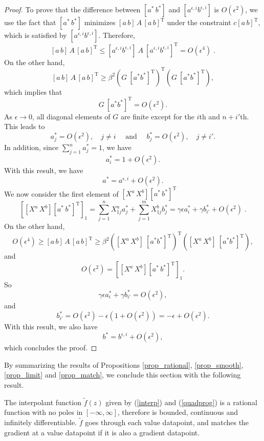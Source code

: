 \begin{proof}
To prove that the difference between $[a^*\,b^*]$ and
$[a^{\epsilon,i} b^{\epsilon,i}]$ is $O(\epsilon^2)$, we use the fact that
$[a^*\,b^*]$ minimizes
$[a\,b]\,A\,[a\,b]^{\mathrm{T}}$ under the constraint $c [a\,b]^{\mathrm{T}}$,
which is satisfied by $[a^{\epsilon,i} b^{\epsilon,i}]$.  Therefore,
\[ [a\,b]\,A\,[a\,b]^{\mathrm{T}} \le 
   [a^{\epsilon,i} b^{\epsilon,i}]\: A\:
      [a^{\epsilon,i} b^{\epsilon,i}]^{\mathrm T} = O(\epsilon^4) \;.\]
On the other hand,
\[ [a\,b]\,A\,[a\,b]^{\mathrm{T}} \ge 
   \beta^2 \left(G\:[a^*b^*]^{\mathrm T}\right)^{\mathrm T}
   \left(G\: [a^*b^*]^{\mathrm T}\right), \]
which implies that \[ G\: [a^*b^*]^{\mathrm T} = O(\epsilon^2). \]
As $\epsilon\to0$, all diagonal elements of $G$ are finite except for the
$i$th and $n+i'$th.  This leads to
\[ a^*_j = O(\epsilon^2), \quad j\ne i \quad \mbox{ and } \quad
   b^*_j = O(\epsilon^2), \quad j\ne i'. \]
In addition, since $\sum_{j=1}^n a^*_j = 1$, we have
\[ a^*_i = 1 + O(\epsilon^2). \]
With this result, we have
\[ a^* = a^{\epsilon,i} + O(\epsilon^2) .\]
We now consider the first element of
$ [X^a\,X^b][a^*\,b^*]^{\mathrm{T}} $
\[ \left[[X^a\,X^b][a^*\,b^*]^{\mathrm{T}}\right]_1
 = \sum_{j=1}^n X^a_{1j} a^*_j + \sum_{j=1}^m X^b_{1j} b^*_j
 = \gamma \epsilon a^*_i + \gamma b^*_{i'} + O(\epsilon^2) \;.\]
On the other hand,
\[ O(\epsilon^4) \ge [a\,b]\,A\,[a\,b]^{\mathrm{T}} \ge
   \beta^2 \left([X^a\,X^b]\: [a^* b^*]^{\mathrm T}\right)^{\mathrm T}
   \left([X^a\,X^b]\: [a^* b^*]^{\mathrm T}\right), \]
and
\[ O(\epsilon^2) = \left[[X^a\,X^b][a^*\,b^*]^{\mathrm{T}}\right]_1 . \]
So
\[ \gamma \epsilon a^*_i + \gamma b^*_{i'} = O(\epsilon^2), \]
and
\[ b^*_{i'} = O(\epsilon^2) - \epsilon (1 + O(\epsilon^2))
            = -\epsilon + O(\epsilon^2) . \]
With this result, we also have
\[ b^* = b^{\epsilon,i} + O(\epsilon^2) ,\]
which concludes the proof.
\end{proof}

By summarizing the results of Propositions \ref{prop_rational},
\ref{prop_smooth}, \ref{prop_limit} and \ref{prop_match}, we conclude this
section with the following result.
\begin{corollary}
The interpolant function ${\tilde f}(z)$ given by (\ref{interp}) and
(\ref{quadprog}) is a rational function with no poles in $[-\infty, \infty]$,
therefore is bounded, continuous and infinitely differentiable.
$\tilde f$ goes through each value datapoint, and matches the gradient
at a value datapoint if it is also a gradient datapoint.
\end{corollary}



